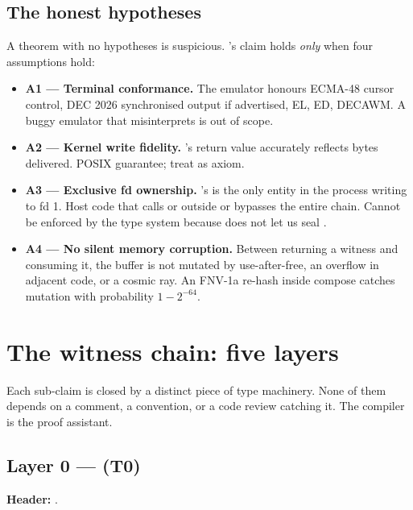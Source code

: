 \subsection{The honest hypotheses}

A theorem with no hypotheses is suspicious. \maya{}'s claim holds
\emph{only} when four assumptions hold:

\begin{itemize}[leftmargin=*]
  \item \textbf{A1 --- Terminal conformance.} The emulator honours
    ECMA-48 cursor control, DEC 2026 synchronised output if
    advertised, EL, ED, DECAWM. A buggy emulator that misinterprets
     is out of scope.
  \item \textbf{A2 --- Kernel write fidelity.} 's
    return value accurately reflects bytes delivered. POSIX
    guarantee; treat as axiom.
  \item \textbf{A3 --- Exclusive fd ownership.} \maya{}'s
     is the only entity in the process writing to
    fd 1. Host code that calls  or
     outside  or
     bypasses the entire chain.
    Cannot be enforced by the type system because \cpp{} does not
    let us seal .
  \item \textbf{A4 --- No silent memory corruption.} Between
     returning a witness and
     consuming it, the
     buffer is not mutated by use-after-free, an
    overflow in adjacent code, or a cosmic ray. An FNV-1a re-hash
    inside compose catches mutation with probability $1 - 2^{-64}$.
\end{itemize}

\section{The witness chain: five layers}

Each sub-claim is closed by a distinct piece of type machinery.
None of them depends on a comment, a convention, or a code review
catching it. The compiler is the proof assistant.

\subsection{Layer 0 ---  (T0)}

\textbf{Header:} .


